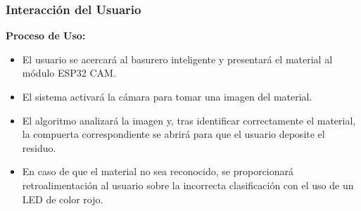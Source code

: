 \subsubsection{Interacción del Usuario}

\textbf{Proceso de Uso:}
\begin{itemize}
    \item El usuario se acercará al basurero inteligente y presentará el material al módulo ESP32 CAM.
    \item El sistema activará la cámara para tomar una imagen del material.
    \item El algoritmo analizará la imagen y, tras identificar correctamente el material, la compuerta correspondiente se abrirá para que el usuario deposite el residuo.
    \item En caso de que el material no sea reconocido, se proporcionará retroalimentación al usuario sobre la incorrecta clasificación con el uso de un LED de color rojo.
\end{itemize}
